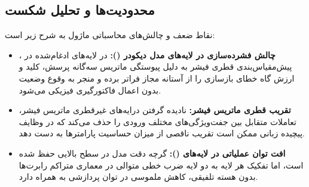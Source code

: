 \subsection{محدودیت‌ها و تحلیل شکست}
نقاط ضعف و چالش‌های محاسباتی ماژول  به شرح زیر است:
\begin{itemize}
    \item \textbf{چالش فشرده‌سازی در لایه‌های مدل دیکودر ():} در لایه‌های ادغام‌شده  در ، پیش‌مقیاس‌بندی قطری فیشر به دلیل پیوستگی ماتریس سه‌گانه پرسش، کلید و ارزش گاه خطای بازسازی را از آستانه مجاز فراتر برده و منجر به وقوع وضعیت  بدون اعمال فاکتورگیری فیزیکی می‌شود.
    \item \textbf{تقریب قطری ماتریس فیشر:} نادیده گرفتن درایه‌های غیرقطری ماتریس فیشر، تعاملات متقابل بین جفت‌ویژگی‌های مختلف ورودی را حذف می‌کند که در وظایف پیچیده زبانی ممکن است تقریب ناقصی از میزان حساسیت پارامترها به دست دهد.
    \item \textbf{افت توان عملیاتی در لایه‌های  ():} گرچه دقت مدل  در سطح بالایی حفظ شده است، اما تفکیک هر لایه به دو لایه ضرب خطی متوالی در معماری متراکم رابرت‌ها بدون هسته تلفیقی، کاهش ملموسی در توان پردازشی به همراه دارد.
\end{itemize}
